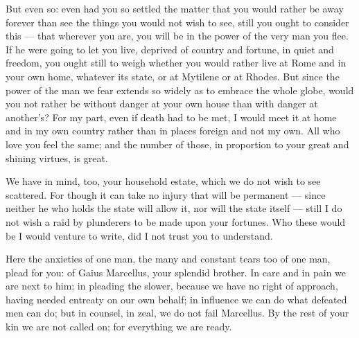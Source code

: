  But even so: even had you so settled the matter that you would rather be away forever than see the things you would not wish to see, still you ought to consider this --- that wherever you are, you will be in the power of the very man you flee. If he were going to let you live, deprived of country and fortune, in quiet and freedom, you ought still to weigh whether you would rather live at Rome and in your own home, whatever its state, or at Mytilene or at Rhodes. But since the power of the man we fear extends so widely as to embrace the whole globe, would you not rather be without danger at your own house than with danger at another's? For my part, even if death had to be met, I would meet it at home and in my own country rather than in places foreign and not my own. All who love you feel the same; and the number of those, in proportion to your great and shining virtues, is great.

 We have in mind, too, your household estate, which we do not wish to see scattered. For though it can take no injury that will be permanent --- since neither he who holds the state will allow it, nor will the state itself --- still I do not wish a raid by plunderers to be made upon your fortunes. Who these would be I would venture to write, did I not trust you to understand.

 Here the anxieties of one man, the many and constant tears too of one man, plead for you: of Gaius Marcellus, your splendid brother. In care and in pain we are next to him; in pleading the slower, because we have no right of approach, having needed entreaty on our own behalf; in influence we can do what defeated men can do; but in counsel, in zeal, we do not fail Marcellus. By the rest of your kin we are not called on; for everything we are ready.
